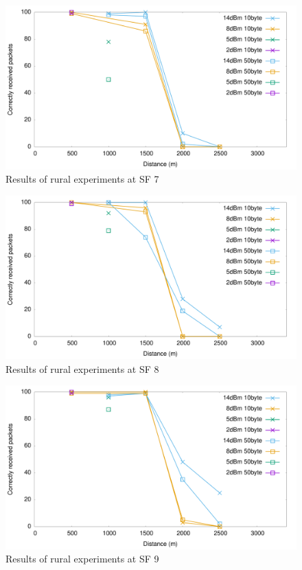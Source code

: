 \begin{figure}[]
\centering
\includegraphics[width=\textwidth]{img/test/rural/sf7}
\caption{Results of rural experiments at SF 7}
\label{fig:sf7rural}
\end{figure}

\begin{figure}[]
\centering
\includegraphics[width=\textwidth]{img/test/rural/sf8}
\caption{Results of rural experiments at SF 8}
\label{fig:sf8rural}
\end{figure}

\begin{figure}[]
\centering
\includegraphics[width=\textwidth]{img/test/rural/sf9}
\caption{Results of rural experiments at SF 9}
\label{fig:sf9rural}
\end{figure}


